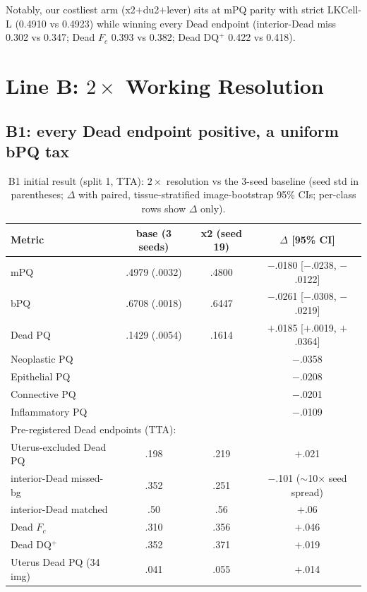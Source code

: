 \documentclass[11pt]{article}
\begin{document}
Notably, our costliest arm (x2$+$du2$+$lever) sits at mPQ parity with strict LKCell-L (0.4910
vs 0.4923) while winning every Dead endpoint (interior-Dead miss 0.302 vs 0.347; Dead
$F_c$ 0.393 vs 0.382; Dead DQ$^+$ 0.422 vs 0.418).

\section{Line B: $2\times$ Working Resolution}
\label{sec:lineB}

\subsection{B1: every Dead endpoint positive, a uniform bPQ tax}
\label{sec:b1}

\begin{table}[t]
\centering\small
\caption{B1 initial result (split 1, TTA): $2\times$ resolution vs the 3-seed baseline
(seed std in parentheses; $\Delta$ with paired, tissue-stratified image-bootstrap 95\% CIs;
per-class rows show $\Delta$ only).}
\label{tab:b1}
\begin{tabular}{lccc}
\toprule
Metric & base (3 seeds) & x2 (seed 19) & $\Delta$ [95\% CI] \\
\midrule
mPQ                & .4979 (.0032) & .4800 & $-$.0180 [$-$.0238, $-$.0122] \\
bPQ                & .6708 (.0018) & .6447 & $\mathbf{-}$.0261 [$-$.0308, $-$.0219] \\
Dead PQ            & .1429 (.0054) & .1614 & $\mathbf{+}$.0185 [$+$.0019, $+$.0364] \\
Neoplastic PQ      & & & $-$.0358 \\
Epithelial PQ      & & & $-$.0208 \\
Connective PQ      & & & $-$.0201 \\
Inflammatory PQ    & & & $-$.0109 \\
\midrule
\multicolumn{4}{l}{Pre-registered Dead endpoints (TTA):}\\
\quad Uterus-excluded Dead PQ & .198 & .219 & $+$.021 \\
\quad interior-Dead missed-bg & .352 & .251 & $-$.101 ($\sim$10$\times$ seed spread) \\
\quad interior-Dead matched   & .50 & .56 & $+$.06 \\
\quad Dead $F_c$              & .310 & .356 & $+$.046 \\
\quad Dead DQ$^+$             & .352 & .371 & $+$.019 \\
\quad Uterus Dead PQ (34 img) & .041 & .055 & $+$.014 \\
\bottomrule
\end{tabular}
\end{table}
\end{document}
